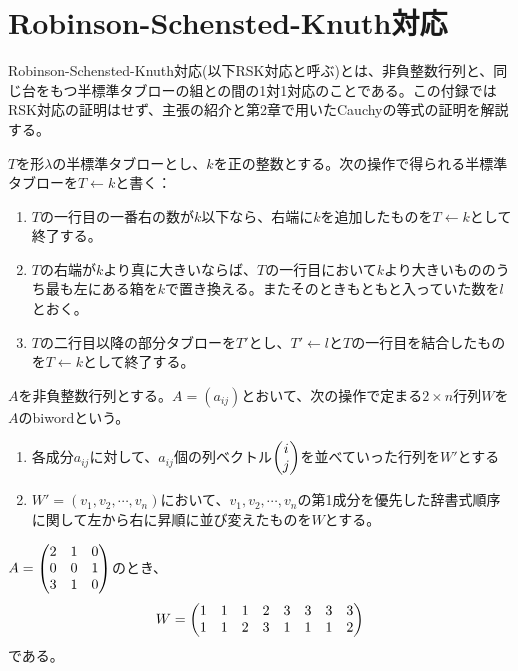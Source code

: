 \documentclass{ltjsreport}
\begin{document}
\appendix
\chapter{Robinson-Schensted-Knuth対応}

Robinson-Schensted-Knuth対応(以下RSK対応と呼ぶ)とは、非負整数行列と、同じ台をもつ半標準タブローの組との間の1対1対応のことである。この付録ではRSK対応の証明はせず、主張の紹介と第2章で用いたCauchyの等式の証明を解説する。

\begin{defin}[行挿入]
  $T$を形$\lambda$の半標準タブローとし、$k$を正の整数とする。次の操作で得られる半標準タブローを$T\leftarrow k$と書く：
  \begin{enumerate}
    \item $T$の一行目の一番右の数が$k$以下なら、右端に$k$を追加したものを$T\leftarrow k$として終了する。
    \item $T$の右端が$k$より真に大きいならば、$T$の一行目において$k$より大きいもののうち最も左にある箱を$k$で置き換える。またそのときもともと入っていた数を$l$とおく。
    \item $T$の二行目以降の部分タブローを$T'$とし、$T'\leftarrow l$と$T$の一行目を結合したものを$T\leftarrow k$として終了する。
  \end{enumerate}
\end{defin}

\begin{defin}
  $A$を非負整数行列とする。$A=(a_{ij})$とおいて、次の操作で定まる$2\times n$行列$W$を$A$のbiwordという。
  \begin{enumerate}
    \item 各成分$a_{ij}$に対して、$a_{ij}$個の列ベクトル$\begin{pmatrix} i\\j \end{pmatrix}$を並べていった行列を$W'$とする
    \item $W'=(v_1,v_2,\cdots,v_n)$において、$v_1,v_2,\cdots,v_n$の第1成分を優先した辞書式順序に関して左から右に昇順に並び変えたものを$W$とする。
  \end{enumerate}
\end{defin}

\begin{eg}
  $A=\begin{pmatrix} 2 & 1 & 0\\0 &0 &1\\3 &1 &0 \end{pmatrix}$のとき、
  \[
  W=\begin{pmatrix} 
    1 & 1 & 1 & 2 & 3 & 3 & 3 & 3\\
    1 & 1 & 2 & 3 & 1 & 1 & 1 & 2
   \end{pmatrix}
  \]
  である。
\end{eg}
\end{document}
